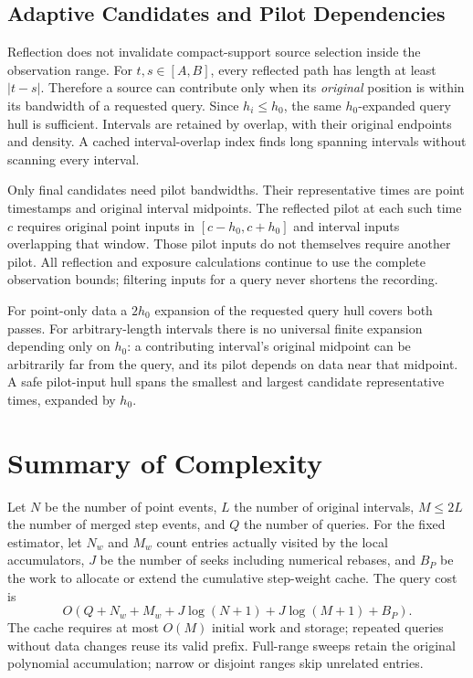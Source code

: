 \documentclass[11pt,a4paper]{article}
\begin{document}
\subsection{Adaptive Candidates and Pilot Dependencies}

Reflection does not invalidate compact-support source selection inside
the observation range.  For $t,s\in[A,B]$, every reflected path has length
at least $|t-s|$.  Therefore a source can contribute only when its
\emph{original} position is within its bandwidth of a requested query.
Since $h_i\le h_0$, the same $h_0$-expanded query hull is sufficient.
Intervals are retained by overlap, with their original endpoints and
density.  A cached interval-overlap index finds long spanning intervals
without scanning every interval.

Only final candidates need pilot bandwidths.  Their representative times
are point timestamps and original interval midpoints.  The reflected
pilot at each such time $c$ requires original point inputs in
$[c-h_0,c+h_0]$ and interval inputs overlapping that window.  Those pilot
inputs do not themselves require another pilot.  All reflection and
exposure calculations continue to use the complete observation bounds;
filtering inputs for a query never shortens the recording.

For point-only data a $2h_0$ expansion of the requested query hull covers
both passes.  For arbitrary-length intervals there is no universal finite
expansion depending only on $h_0$: a contributing interval's original
midpoint can be arbitrarily far from the query, and its pilot depends on
data near that midpoint.  A safe pilot-input hull spans the smallest and
largest candidate representative times, expanded by $h_0$.

\section{Summary of Complexity}
\label{sec:complexity}

Let $N$ be the number of point events, $L$ the number of original
intervals, $M\le2L$ the number of merged step events, and $Q$ the number
of queries.  For the fixed estimator, let $N_w$ and $M_w$ count entries
actually visited by the local accumulators, $J$ be the number of seeks
including numerical rebases, and $B_P$ be the work to allocate or extend
the cumulative step-weight cache.  The query cost is
\begin{equation}
  O\!\left(Q+N_w+M_w+J\log(N+1)+J\log(M+1)+B_P\right).
\end{equation}
The cache requires at most $O(M)$ initial work and storage; repeated
queries without data changes reuse its valid prefix.  Full-range sweeps
retain the original polynomial accumulation; narrow or disjoint ranges
skip unrelated entries.
\end{document}
